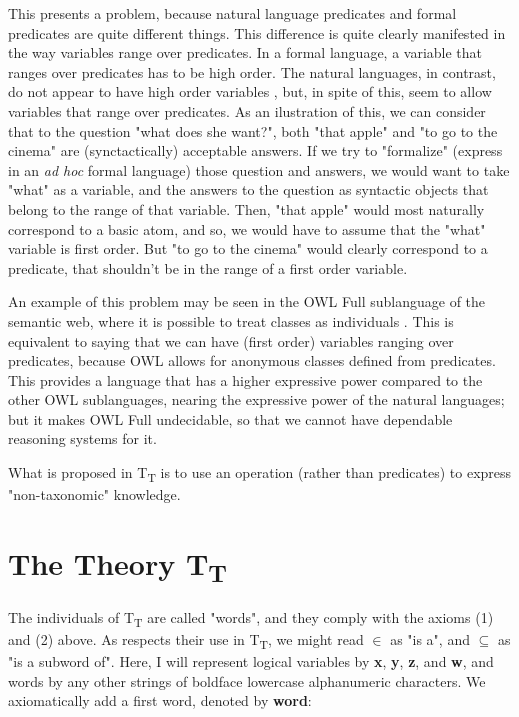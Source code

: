 \documentclass{IOS-Book-Article}     %
\begin{document}
This presents a problem, because natural language predicates and formal
predicates are quite different things. This difference is quite clearly
manifested in the way variables range over predicates. In a formal language,
a variable that ranges over predicates has to be high order.
The natural languages, in contrast, do not appear to have high
order variables \cite{r5}, but, in spite of this, seem to allow
variables that range over predicates. As an ilustration of this,
we can consider that to the question "what does she want?", both "that apple"
and "to go to the cinema" are (synctactically) acceptable answers.
If we try to "formalize" (express in an \textit{ad hoc} formal language)
those question and answers, we would
want to take "what" as a variable, and the answers to the question as
syntactic objects that belong to the range of that variable.
Then, "that apple" would most naturally correspond to a basic atom,
and so, we would have to assume that the "what" variable is first order.
But "to go to the cinema" would clearly correspond to a predicate,
that shouldn't be in the range of a first order variable.

An example of this problem may be seen in the OWL Full sublanguage of
the semantic web, where it is possible to treat classes as individuals
\cite{r6}. This is equivalent to saying that we can have (first order)
variables ranging over predicates, because OWL
allows for anonymous classes defined from predicates. This provides a
language that has a higher expressive power compared to the other OWL
sublanguages, nearing the expressive power of the natural languages;
but it makes OWL Full undecidable, so that we cannot have dependable
reasoning systems for it.

What is proposed in T\textsubscript{T} is to use an operation
(rather than predicates) to express "non-taxonomic" knowledge.

\section{The Theory T\textsubscript{T}}
The individuals of T\textsubscript{T} are called "words", and they comply with
the axioms (1) and (2) above. As respects their use in T\textsubscript{T},
we might read $\in$ as "is a", and $\subseteq$ as "is a subword of".
Here, I will represent logical variables
by \textbf{x}, \textbf{y}, \textbf{z}, and \textbf{w}, and words
by any other strings of boldface lowercase alphanumeric
characters. We axiomatically add a first word, denoted by \textbf{word}:
\end{document}
